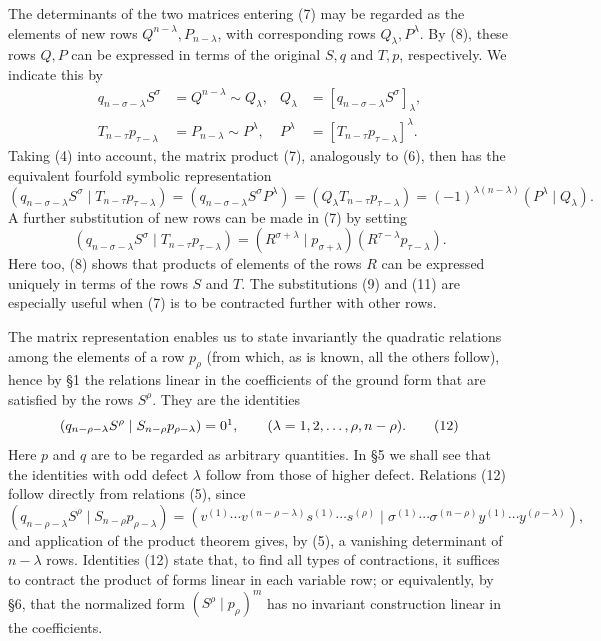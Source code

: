 \documentclass[10pt]{article}
\newcommand{\pair}[2]{(#1\mid #2)}
\begin{document}
The determinants of the two matrices entering (7) may be regarded as the elements of new rows $Q^{n-\lambda},P_{n-\lambda}$, with corresponding rows $Q_\lambda,P^\lambda$. By (8), these rows $Q,P$ can be expressed in terms of the original $S,q$ and $T,p$, respectively. We indicate this by
\begin{equation}
\begin{aligned}
q_{n-\sigma-\lambda}S^\sigma&=Q^{n-\lambda}\sim Q_\lambda,
& Q_\lambda&=[q_{n-\sigma-\lambda}S^\sigma]_\lambda,\\
T_{n-\tau}p_{\tau-\lambda}&=P_{n-\lambda}\sim P^\lambda,
& P^\lambda&=[T_{n-\tau}p_{\tau-\lambda}]^\lambda.
\end{aligned}
\tag{9}
\end{equation}
Taking (4) into account, the matrix product (7), analogously to (6), then has the equivalent fourfold symbolic representation
\begin{equation}
\pair{q_{n-\sigma-\lambda}S^\sigma}{T_{n-\tau}p_{\tau-\lambda}}
=(q_{n-\sigma-\lambda}S^\sigma P^\lambda)
=(Q_\lambda T_{n-\tau}p_{\tau-\lambda})
=(-1)^{\lambda(n-\lambda)}\pair{P^\lambda}{Q_\lambda}.
\tag{10}
\end{equation}
A further substitution of new rows can be made in (7) by setting
\begin{equation}
\pair{q_{n-\sigma-\lambda}S^\sigma}{T_{n-\tau}p_{\tau-\lambda}}
=\pair{R^{\sigma+\lambda}}{p_{\sigma+\lambda}}(R^{\tau-\lambda}p_{\tau-\lambda}).
\tag{11}
\end{equation}
Here too, (8) shows that products of elements of the rows $R$ can be expressed uniquely in terms of the rows $S$ and $T$. The substitutions (9) and (11) are especially useful when (7) is to be contracted further with other rows.

The matrix representation enables us to state invariantly the quadratic relations among the elements of a row $p_\rho$ (from which, as is known, all the others follow), hence by \S1 the relations linear in the coefficients of the ground form that are satisfied by the rows $S^\rho$. They are the identities
\begin{equation}
\pair{q_{n-\rho-\lambda}S^\rho}{S_{n-\rho}p_{\rho-\lambda}}=0\footnotemark,
\qquad(\lambda=1,2,\ldots,\rho,n-\rho).
\tag{12}
\end{equation}
Here $p$ and $q$ are to be regarded as arbitrary quantities. In \S5 we shall see that the identities with odd defect $\lambda$ follow from those of higher defect. Relations (12) follow directly from relations (5), since
\[
\pair{q_{n-\rho-\lambda}S^\rho}{S_{n-\rho}p_{\rho-\lambda}}
=\pair{v^{(1)}\cdots v^{(n-\rho-\lambda)}s^{(1)}\cdots s^{(\rho)}}
{\sigma^{(1)}\cdots\sigma^{(n-\rho)}y^{(1)}\cdots y^{(\rho-\lambda)}},
\]
and application of the product theorem gives, by (5), a vanishing determinant of $n-\lambda$ rows. Identities (12) state that, to find all types of contractions, it suffices to contract the product of forms linear in each variable row; or equivalently, by \S6, that the normalized form $(S^\rho\mid p_\rho)^m$ has no invariant construction linear in the coefficients.
\end{document}
